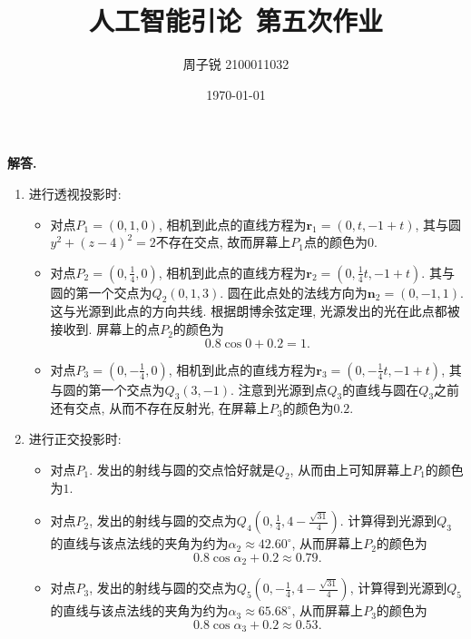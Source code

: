 \documentclass[11pt]{article}
\newenvironment{solution}{\par\noindent\textbf{解答. }}{\par}
\begin{document}
	
	\title{\textbf{人工智能引论\ 第五次作业}}
	\author{周子锐 2100011032}
	\date{\today}
	\maketitle

	\section{}
	\begin{solution}
		\begin{enumerate}[(1)]
			\item 进行透视投影时:
			\begin{itemize}
				\item 对点$P_1=(0,1,0)$, 相机到此点的直线方程为$\bm{r}_1=(0,t,-1+t)$, 其与圆$y^2+(z-4)^2=2$不存在交点, 故而屏幕上$P_1$点的颜色为0.
				\item 对点$P_2=(0,\frac{1}{4},0)$, 相机到此点的直线方程为$\bm{r}_2=(0,\frac{1}{4}t,-1+t)$. 其与圆的第一个交点为$Q_2(0,1,3)$. 圆在此点处的法线方向为$\bm{n}_2=(0,-1,1)$. 这与光源到此点的方向共线. 根据朗博余弦定理, 光源发出的光在此点都被接收到. 屏幕上的点$P_2$的颜色为$$ 0.8\cos 0 + 0.2=1.$$
				\item 对点$P_3=(0,-\frac{1}{4},0)$, 相机到此点的直线方程为$\bm{r}_3=(0,-\frac{1}{4}t,-1+t)$, 其与圆的第一个交点为$Q_3(3,-1)$. 注意到光源到点$Q_3$的直线与圆在$Q_3$之前还有交点, 从而不存在反射光, 在屏幕上$P_3$的颜色为$0.2$.
			\end{itemize}
			\item 进行正交投影时:
			\begin{itemize}
				\item 对点$P_1$. 发出的射线与圆的交点恰好就是$Q_2$, 从而由上可知屏幕上$P_1$的颜色为$1$.
				\item 对点$P_2$, 发出的射线与圆的交点为$Q_4(0,\frac{1}{4},4-\frac{\sqrt{31}}{4})$. 计算得到光源到$Q_3$的直线与该点法线的夹角为约为$\alpha_2\approx 42.60^\circ$, 从而屏幕上$P_2$的颜色为$$ 0.8\cos \alpha_2+ 0.2\approx 0.79.$$
				\item 对点$P_3$, 发出的射线与圆的交点为$Q_5(0,-\frac{1}{4},4-\frac{\sqrt{31}}{4})$, 计算得到光源到$Q_5$的直线与该点法线的夹角为约为$\alpha_3\approx 65.68^\circ$, 从而屏幕上$P_3$的颜色为$$ 0.8\cos \alpha_3+ 0.2\approx 0.53.$$
			\end{itemize}
			
		\end{enumerate}
	\end{solution}
\end{document}
